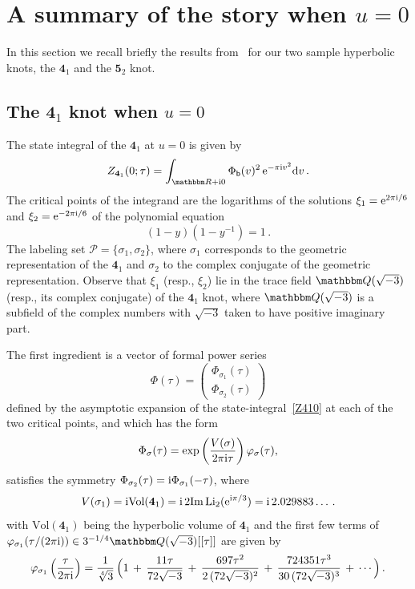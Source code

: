 \documentclass[12pt,reqno]{amsart}
\theoremstyle{definition}
\def\BQ{\mathbbm Q}
\def\BR{\mathbbm R}
\def\calP{\mathcal P}
\def\s{\sigma}
\def\+{\,+\,}
\def\be{\begin{equation}}
\def\ee{\end{equation}}
\def\bb{\mathsf{b}}
\def\ri{\mathrm{i}}
\def\rd{\mathrm{d}}
\def\re{{\rm e}}
\def\ri{{\rm i}}
\def\rd{{\rm d}}
\def\md{\mathbf}
\newcommand{\knot}[1]{\md{#1}}
\begin{document}
\section{A summary of the story when $u=0$}
\label{sec.summary}

In this section we recall briefly the results
from~\cite{GGM:resurgent} for our two sample hyperbolic knots, the
$\knot{4}_1$ and the $\knot{5}_2$ knot.

\subsection{The $\knot{4}_1$ knot when $u=0$}
\label{sub.41x=1}

The state integral of the $\knot{4}_1$ at $u=0$ is given by
\begin{equation}
  \label{Z410}
  Z_{\knot{4}_1}(0;\tau) = 
  \int_{\BR+\ri 0} \Phi_\bb(v)^2 \, \re^{-\pi \ri v^2} \rd v \,.
\end{equation}
The critical points of the integrand are the logarithms of the
solutions $\xi_1= {\rm e}^{2 \pi \ri/6}$ and
$\xi_2= \re^{-2 \pi \ri/6}$ of the polynomial equation
\begin{equation}
  \label{41xi}
  (1-y)(1-y^{-1})=1 \,.
\end{equation}
The labeling set $\calP=\{\s_1,\s_2\}$, where $\s_1$ corresponds to
the geometric representation of the $\knot{4}_1$ and $\s_2$ to the
complex conjugate of the geometric representation. Observe that
$\xi_1$ (resp., $\xi_2$) lie in the trace field $\BQ(\sqrt{-3})$
(resp., its complex conjugate) of the $\knot{4}_1$ knot, where
$\BQ(\sqrt{-3})$ is a subfield of the complex numbers with $\sqrt{-3}$
taken to have positive imaginary part.

The first ingredient is a vector of formal power series 
%
\be
\Phi(\tau)=
\begin{pmatrix} \Phi_{\s_1}(\tau)\\ \Phi_{\s_2}(\tau) \end{pmatrix} 
\ee
%
defined by the asymptotic expansion of the state-integral~\eqref{Z410}
at each of the two critical points, and which has the form
%
\be
\Phi_{\s}(\tau) = \exp\left( { V(\s) \over 2\pi \ri \tau} \right)
\varphi_\s(\tau),
\ee
%
satisfies the symmetry
$\Phi_{\s_2}(\tau) = {\rm \ri} \Phi_{\s_1}(-\tau)$, where 
%
\begin{equation}
  \label{volume-41}
  V(\s_1)= \ri \text{Vol}(\knot{4}_1)
  = \ri\, 2 {\rm Im}\, {\rm Li}_2(\re^{\ri \pi/3})
  = \ri\, 2.029883\dots \,.
\end{equation}
%
with $\text{Vol}(\knot{4}_1)$ being the hyperbolic volume of
$\knot{4}_1$ and the first few terms of
$\varphi_{\s_1}(\tau/(2\pi \ri)) \in 3^{-1/4} \BQ(\sqrt{-3})[[\tau]]$
are given by
\begin{equation}
  \label{varphi41}
  \varphi_{\s_1}\left(\frac{\tau}{2\pi \ri}\right) =
  \frac{1}{\sqrt[4]3}\, 
  \Bigl(1 \+ \frac{11\tau}{72\sqrt{-3}}
  \+ \frac{697\tau^2}{2\,(72\sqrt{-3})^2}
  \+ \frac{724351\tau^3}{30\,(72\sqrt{-3})^3} \+\cdots\Bigr)\,. 
\end{equation}
\end{document}
